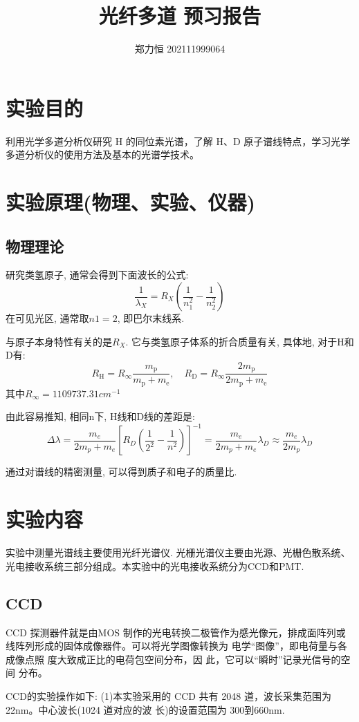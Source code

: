 \documentclass[12pt,a4paper]{article}
\title{\vspace{-4cm}\Large 光纤多道 预习报告}  %
\author{\kaishu 郑力恒 202111999064}   %
\date{}
\begin{document}
\maketitle
\section{实验目的}
利用光学多道分析仪研究 H 的同位素光谱，了解 H、D 原子谱线特点，学习光学多道分析仪的使用方法及基本的光谱学技术。

\section{实验原理(物理、实验、仪器)}
\subsection{物理理论}
研究类氢原子, 通常会得到下面波长的公式:
$$\frac{1}{\lambda_{X}}=R_{X}\left(\frac{1}{n_{1}^{2}}-\frac{1}{n_{2}^{2}}\right)$$
在可见光区, 通常取$n1=2$, 即巴尔末线系. 

与原子本身特性有关的是$R_{X}$. 它与类氢原子体系的折合质量有关, 具体地, 对于H和D有: 
$$R_{\mathrm{H}}=R_{\infty} \frac{m_{\mathrm{p}}}{m_{\mathrm{p}}+m_{\mathrm{e}}}, \quad R_{\mathrm{D}}=R_{\infty} \frac{2 m_{\mathrm{p}}}{2 m_{\mathrm{p}}+m_{\mathrm{e}}}$$
其中$R_{\infty}=1109737.31cm^{-1}$

由此容易推知, 相同n下, H线和D线的差距是: 
$$\Delta \lambda=\frac{m_{e}}{2 m_{p}+m_{e}}\left[R_{D}\left(\frac{1}{2^{2}}-\frac{1}{n^{2}}\right)\right]^{-1}=\frac{m_{e}}{2 m_{p}+m_{e}} \lambda_{D}\approx \frac{m_e}{2m_p} \lambda_{D}$$

通过对谱线的精密测量, 可以得到质子和电子的质量比. 
\section{实验内容}
实验中测量光谱线主要使用光纤光谱仪. 光栅光谱仪主要由光源、光栅色散系统、光电接收系统三部分组成。本实验中的光电接收系统分为CCD和PMT. 

\subsection{CCD}
CCD 探测器件就是由MOS
制作的光电转换二极管作为感光像元，排成面阵列或线阵列形成的固体成像器件。可以将光学图像转换为
电学“图像”，即电荷量与各成像点照
度大致成正比的电荷包空间分布，因
此，它可以“瞬时”记录光信号的空间
分布。

CCD的实验操作如下: 
(1)本实验采用的 CCD 共有 2048 道，波长采集范围为 22nm。中心波长(1024 道对应的波
长)的设置范围为 300到660nm.
\end{document}
